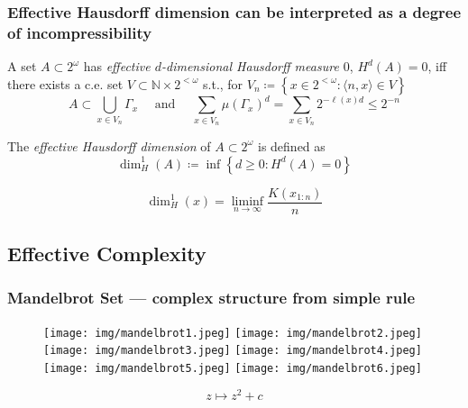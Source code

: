 \documentclass[UTF8,11pt,colorlinks,compress,openany]{beamer}%
\begin{document}
\begin{frame}\frametitle{Effective Hausdorff dimension can be interpreted as a degree of incompressibility}
\begin{definition}
A set $A\subset 2^\omega$ has \emph{effective $d$-dimensional Hausdorff measure $0$}, $H^d(A)=0$, iff there exists a c.e. set $V\subset\mathbb{N}\times 2^{<\omega}$ s.t., for $V_n\coloneqq\left\{x\in 2^{<\omega}: \langle n,x\rangle\in V\right\}$
\[A\subset\bigcup\limits_{x\in V_n}\Gamma_x\quad\mbox{ and }\quad \sum\limits_{x\in V_n}\mu(\Gamma_x)^d=\sum\limits_{x\in V_n}2^{-\ell(x)d}\leq 2^{-n}\]
\end{definition}
\begin{definition}
The \emph{effective Hausdorff dimension} of $A\subset 2^\omega$ is defined as
\[\dim_H^1(A)\coloneqq\inf\left\{d\geq 0: H^d(A)=0\right\}\]
\end{definition}
\begin{theorem}
\[\dim_H^1(x)=\liminf\limits_{n\to\infty}\frac{K(x_{1:n})}{n}\]	
\end{theorem}
\end{frame}

\subsection{Effective Complexity}

\begin{frame}\frametitle{Mandelbrot Set --- complex structure from simple rule}
\vspace*{-2ex}
\begin{figure}[H]
\texttt{[image: img/mandelbrot1.jpeg]}
\texttt{[image: img/mandelbrot2.jpeg]}
\texttt{[image: img/mandelbrot3.jpeg]}
\texttt{[image: img/mandelbrot4.jpeg]}
\texttt{[image: img/mandelbrot5.jpeg]}
\texttt{[image: img/mandelbrot6.jpeg]}
\end{figure}
\[z\mapsto z^2+c\]
\end{frame}
\end{document}

